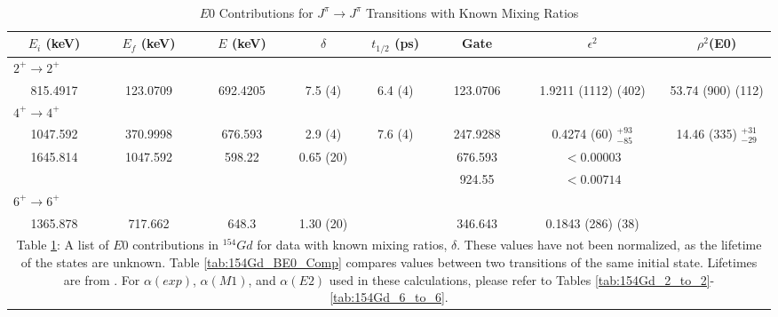 \begin{landscape}
\begin{table}
    \caption{$E0$ Contributions for $J^{\pi}\rightarrow J^{\pi}$ Transitions with Known Mixing Ratios}
    \label{tab:154Gd_E0_d}\\
    \begin{tabular}{c|c|c|c|c|c|c|c}
        \toprule
        $E_i$ (keV)	&	$E_f$ (keV)	& $E$ (keV)	& $\delta$ & $t_{1/2}$ (ps) & Gate &	$\epsilon^2$	& $\rho^2$(E0)	\\
        \hline
        \multicolumn{8}{l}{$2^+\rightarrow 2^+$} 	\\ \hline
        815.4917 & 123.0709 &  692.4205 & 7.5 (4) & 6.4 (4) & 123.0706 & 1.9211 (1112) (402) & 53.74 (900) (112) \\ \hline
        \multicolumn{8}{l}{$4^+\rightarrow 4^+$} 	\\ \hline
        1047.592 & 370.9998 & 676.593 & 2.9 (4) & 7.6 (4) & 247.9288 & 0.4274 (60) $^{+93}_{-85}$ & 14.46 (335) $^{+31}_{-29}$\\ \hline
        1645.814 & 1047.592 & 598.22 & 0.65 (20) & & 676.593 &  $<0.00003$  \\ 
         &  &  &  & & 924.55 &  $<0.00714$  \\ \hline
        \multicolumn{8}{l}{$6^+\rightarrow 6^+$} 	\\ \hline
        1365.878 & 717.662 & 648.3 & 1.30 (20)  & & 346.643 & 0.1843 (286) (38) \\
        \bottomrule
        \multicolumn{8}{p{1.4\textwidth}}{Table \ref{tab:154Gd_E0_d}: A list of $E0$ contributions in $^{154}Gd$ for data with known mixing ratios, $\delta$. These values have not been normalized, as the lifetime of the states are unknown. Table \ref{tab:154Gd_BE0_Comp} compares values between two transitions of the same initial state. Lifetimes are from \citep{tonev04:_154gd}. For $\alpha(exp)$, $\alpha(M1)$, and $\alpha(E2)$ used in these calculations, please refer to Tables \ref{tab:154Gd_2_to_2}-\ref{tab:154Gd_6_to_6}.}
	\end{tabular}
\end{table}
\end{landscape}